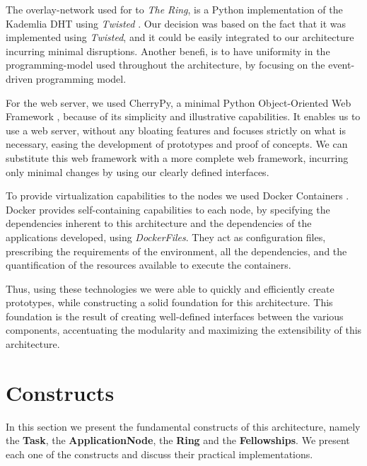 \documentclass[12pt, titlepage]{uo_temp}
\begin{document}
     The overlay-network used for to \emph{The Ring}, is a Python implementation of the
     Kademlia DHT using \emph{Twisted} \cite{kademlia_python}. Our decision was based on
     the fact that it was implemented using \emph{Twisted}, and it could be easily
     integrated to our architecture incurring minimal disruptions. Another benefi, is to
     have uniformity in the programming-model used throughout the architecture, by
     focusing on the event-driven programming model.

     For the web server, we used CherryPy, a minimal Python Object-Oriented Web Framework
     \cite{cherrypy}, because of its simplicity and illustrative capabilities. It enables
     us to use a web server, without any bloating features and focuses strictly on what is
     necessary, easing the development of prototypes and proof of concepts. We can
     substitute this web framework with a more complete web framework, incurring only
     minimal changes by using our clearly defined interfaces.

     To provide virtualization capabilities to the nodes we used Docker Containers
     \cite{docker}. Docker provides self-containing capabilities to each node, by
     specifying the dependencies inherent to this architecture and the dependencies of the
     applications developed, using \emph{DockerFiles}. They act as configuration files,
     prescribing the requirements of the environment, all the dependencies, and the
     quantification of the resources available to execute the containers.

     Thus, using these technologies we were able to quickly and efficiently create
     prototypes, while constructing a solid foundation for this architecture. This
     foundation is the result of creating well-defined interfaces between the various
     components, accentuating the modularity and maximizing the extensibility of this
     architecture.

     \section{Constructs}
     In this section we present the fundamental constructs of this architecture, namely
     the \textbf{Task}, the \textbf{ApplicationNode}, the \textbf{Ring} and the
     \textbf{Fellowships}.  We present each one of the constructs and discuss their
     practical implementations.
\end{document}
